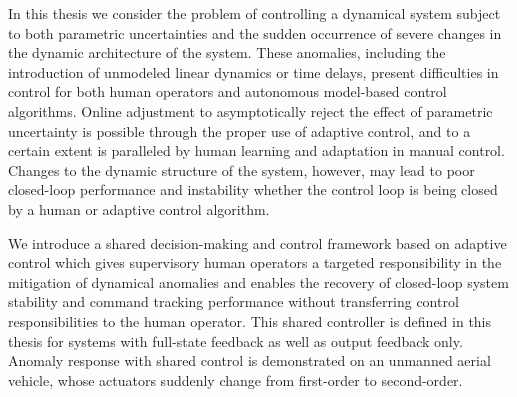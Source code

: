 % 
% 
%



In this thesis we consider the problem of controlling a dynamical system subject to both parametric uncertainties and the sudden occurrence of severe changes in the dynamic architecture of the system. These anomalies, including the introduction of unmodeled linear dynamics or time delays, present difficulties in control for both human operators and autonomous model-based control algorithms. Online adjustment to asymptotically reject the effect of parametric uncertainty is possible through the proper use of adaptive control, and to a certain extent is paralleled by human learning and adaptation in manual control. Changes to the dynamic structure of the system, however, may lead to poor closed-loop performance and instability whether the control loop is being closed by a human or adaptive control algorithm.

We introduce a shared decision-making and control framework based on adaptive control which gives supervisory human operators a targeted responsibility in the mitigation of dynamical anomalies and enables the recovery of closed-loop system stability and command tracking performance without transferring control responsibilities to the human operator. This shared controller is defined in this thesis for systems with full-state feedback as well as output feedback only. Anomaly response with shared control is demonstrated on an unmanned aerial vehicle, whose actuators suddenly change from first-order to second-order.